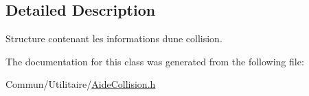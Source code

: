 \subsection{Detailed Description}
Structure contenant les informations d\textquotesingle{}une collision. 

The documentation for this class was generated from the following file\+:\begin{DoxyCompactItemize}
\item 
Commun/\+Utilitaire/\hyperlink{_aide_collision_8h}{Aide\+Collision.\+h}\end{DoxyCompactItemize}
